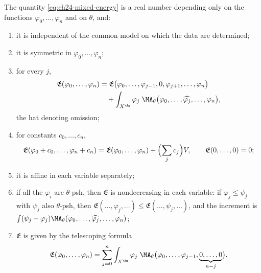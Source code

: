 \begin{proposition}
\label{prop:ch24-energy-basic}
The quantity \eqref{eq:ch24-mixed-energy} is a real number depending only on
the functions \(\varphi_0,\ldots,\varphi_n\) and on \(\theta\), and:
\begin{enumerate}
\item\label{itm:ch24-eb:model} it is independent of the common model on
 which the data are determined;
\item\label{itm:ch24-eb:sym} it is symmetric in \(\varphi_0,\ldots,\varphi_n\);
\item\label{itm:ch24-eb:slot} for every \(j\),
 \begin{equation}
 \label{eq:ch24-energy-slot}
  \begin{aligned}
  \mathfrak E(\varphi_0,\ldots,\varphi_n)
  &=\mathfrak E\bigl(\varphi_0,\ldots,\varphi_{j-1},0,
      \varphi_{j+1},\ldots,\varphi_n\bigr)\\
  &\quad+\int_{X^{\An}}\varphi_j\;
     \MA_\theta\bigl(\varphi_0,\ldots,\widehat{\varphi_j},
       \ldots,\varphi_n\bigr),
  \end{aligned}
 \end{equation}
 the hat denoting omission;
\item\label{itm:ch24-eb:const} for constants \(c_0,\ldots,c_n\),
 \begin{equation}
 \label{eq:ch24-energy-constants}
  \mathfrak E(\varphi_0+c_0,\ldots,\varphi_n+c_n)
  =\mathfrak E(\varphi_0,\ldots,\varphi_n)+\Bigl(\sum_jc_j\Bigr)V,
  \qquad \mathfrak E(0,\ldots,0)=0;
 \end{equation}
\item\label{itm:ch24-eb:affine} it is affine in each variable separately;
\item\label{itm:ch24-eb:mono} if all the \(\varphi_i\) are \(\theta\)-psh,
 then \(\mathfrak E\) is nondecreasing in each variable: if
 \(\varphi_j\leq\psi_j\) with \(\psi_j\) also \(\theta\)-psh, then
 \(\mathfrak E(\ldots,\varphi_j,\ldots)\leq\mathfrak E(\ldots,\psi_j,\ldots)\),
 and the increment is
 \(\int(\psi_j-\varphi_j)\MA_\theta(\varphi_0,\ldots,\widehat{\varphi_j},
 \ldots,\varphi_n)\);
\item\label{itm:ch24-eb:telescope} \(\mathfrak E\) is given by the
 telescoping formula
 \begin{equation}
 \label{eq:ch24-energy-telescoping}
  \mathfrak E(\varphi_0,\ldots,\varphi_n)
  =\sum_{j=0}^{n}\int_{X^{\An}}\varphi_j\;
    \MA_\theta\bigl(\varphi_0,\ldots,\varphi_{j-1},
      \underbrace{0,\ldots,0}_{n-j}\bigr).
 \end{equation}
\end{enumerate}
\end{proposition}

